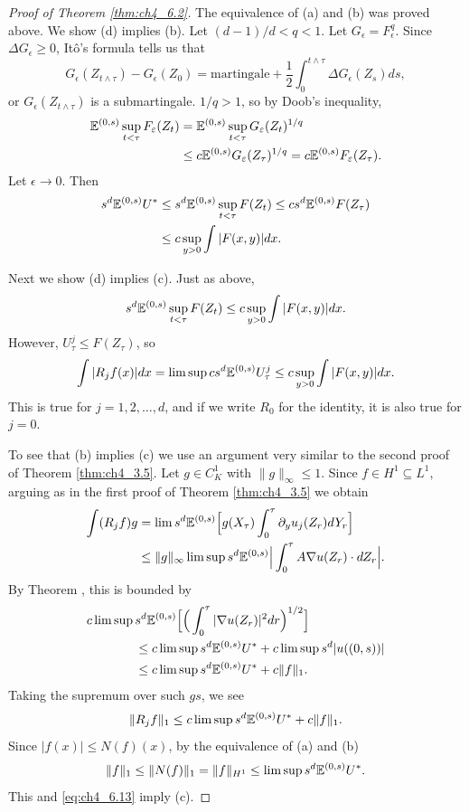 \begin{proof}[Proof of Theorem \ref{thm:ch4_6.2}]
The equivalence of (a) and (b) was proved above. We show (d) implies (b). Let $(d-1)/d < q < 1$. Let $G_\epsilon = F_\epsilon^q$. Since $\Delta G_\epsilon \geq 0$, It\^o's formula tells us that
\[
    G_\epsilon(Z_{t\wedge\tau}) - G_\epsilon(Z_0) = \text{martingale} + \frac{1}{2}\int_0^{t\wedge\tau} \Delta G_\epsilon(Z_s)ds,
\]
or $G_\epsilon(Z_{t\wedge\tau})$ is a submartingale. $1/q > 1$, so by Doob's inequality,
\begin{align}\label{eq:ch4_6.12}
    \mathbb{E}^{(0,s)}\sup_{t<\tau} F_\varepsilon(Z_t) &= \mathbb{E}^{(0,s)}\sup_{t<\tau} G_\varepsilon(Z_t)^{1/q} \\
    &\leq c\mathbb{E}^{(0,s)}G_\varepsilon(Z_\tau)^{1/q} = c\mathbb{E}^{(0,s)}F_\varepsilon(Z_\tau). \notag
\end{align}
Let $\epsilon \to 0$. Then
\begin{align*}
    s^d\mathbb{E}^{(0,s)}U^* &\leq s^d\mathbb{E}^{(0,s)}\sup_{t<\tau} F(Z_t) \leq cs^d\mathbb{E}^{(0,s)}F(Z_\tau) \\
    &\leq c\sup_{y>0}\int |F(x,y)|dx.
\end{align*}

Next we show (d) implies (c). Just as above,
\[
    s^d\mathbb{E}^{(0,s)}\sup_{t<\tau} F(Z_t) \leq c\sup_{y>0}\int |F(x,y)|dx.
\]
However, $U_\tau^j \leq F(Z_\tau)$, so
\[
    \int |R_j f(x)|dx = \limsup cs^d\mathbb{E}^{(0,s)}U_\tau^j \leq c\sup_{y>0}\int |F(x,y)|dx.
\]
\mnewpage
This is true for $j = 1,2,\ldots,d$, and if we write $R_0$ for the identity, it is also true for $j = 0$.

To see that (b) implies (c) we use an argument very similar to the second proof of Theorem \ref{thm:ch4_3.5}. Let $g \in C_K^1$ with $\|g\|_\infty \leq 1$. Since $f \in H^1 \subseteq L^1$, arguing as in the first proof of Theorem \ref{thm:ch4_3.5} we obtain
\begin{align*}
    \int (R_j f)g &= \lim s^d\mathbb{E}^{(0,s)}\Big[g(X_\tau)\int_0^\tau \partial_y u_j(Z_r)dY_r\Big] \\
    &\leq \|g\|_\infty \limsup s^d\mathbb{E}^{(0,s)}\Big|\int_0^\tau A\nabla u(Z_r)\cdot dZ_r\Big|.
\end{align*}
By Theorem , this is bounded by
\begin{align*}
    c\limsup \,&s^d\mathbb{E}^{(0,s)}\Big[\Big(\int_0^\tau |\nabla u(Z_r)|^2dr\Big)^{1/2}\Big] \\
    &\leq c\limsup s^d\mathbb{E}^{(0,s)}U^* + c\limsup s^d|u((0,s))| \\
    &\leq c\limsup s^d\mathbb{E}^{(0,s)}U^* + c\|f\|_1.
\end{align*}
Taking the supremum over such $gs$, we see
\begin{equation}\label{eq:ch4_6.13}
    \|R_j f\|_1 \leq c\limsup s^d\mathbb{E}^{(0,s)}U^* + c\|f\|_1.
\end{equation}
Since $|f(x)| \leq N(f)(x)$, by the equivalence of (a) and (b)
\[
    \|f\|_1 \leq \|N(f)\|_1 = \|f\|_{H^1} \leq \limsup s^d\mathbb{E}^{(0,s)}U^*.
\]
This and \eqref{eq:ch4_6.13} imply (c).


\end{proof}

